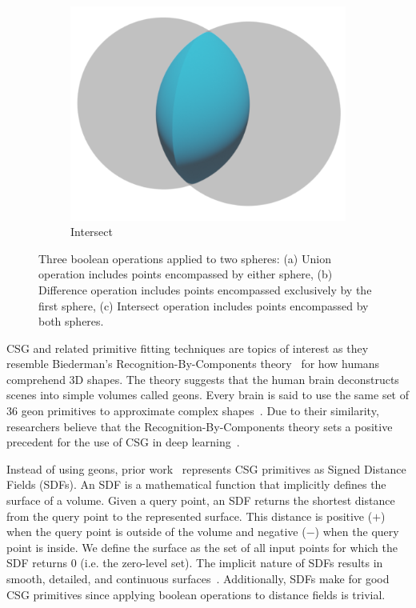 \begin{figure}
\begin{subfigure}[t]{0.3\textwidth}
		\includegraphics[width=\textwidth]{Images/Intersect}
		\caption{Intersect}
	\end{subfigure}
	\caption{Three boolean operations applied to two spheres: (a) Union operation includes points encompassed by either sphere, (b) Difference operation includes points encompassed exclusively by the first sphere, (c) Intersect operation includes points encompassed by both spheres.}
	\label{fig:boolean operations}
\end{figure}

CSG and related primitive fitting techniques are topics of interest as they resemble Biederman's Recognition-By-Components theory~\cite{Biederman1987} for how humans comprehend 3D shapes. The theory suggests that the human brain deconstructs scenes into simple volumes called geons. Every brain is said to use the same set of 36 geon primitives to approximate complex shapes~\cite{Biederman1987}. Due to their similarity, researchers believe that the Recognition-By-Components theory sets a positive precedent for the use of CSG in deep learning~\cite{Sharma2018}.

Instead of using geons, prior work~\cite{Sharma2018, Kania2020, Ren2021} represents CSG primitives as Signed Distance Fields (SDFs). An SDF is a mathematical function that implicitly defines the surface of a volume. Given a query point, an SDF returns the shortest distance from the query point to the represented surface. This distance is positive ($+$) when the query point is outside of the volume and negative ($-$) when the query point is inside. We define the surface as the set of all input points for which the SDF returns 0 (i.e. the zero-level set). The implicit nature of SDFs results in smooth, detailed, and continuous surfaces~\cite{Park2019}. Additionally, SDFs make for good CSG primitives since applying boolean operations to distance fields is trivial.

